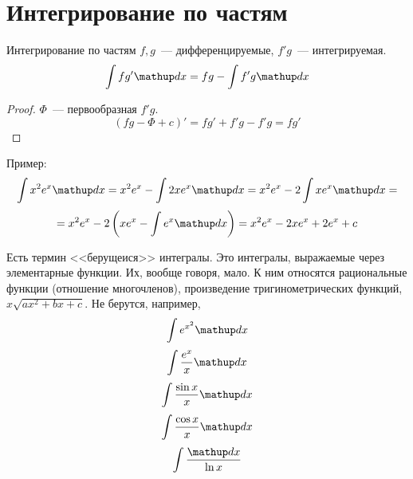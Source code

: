 ﻿\section{Интегрирование по частям}

\begin{theorem}{Интегрирование по частям}
$f, g$~--- дифференцируемые, $f'g$~--- интегрируемая.
$$\int fg'\d x = fg - \int f'g \d x$$
\end{theorem}
\begin{proof}
$\Phi$~--- первообразная $f'g$.
$$(fg - \Phi + c)' = fg' + f'g - f'g = fg'$$
\end{proof}

Пример:
$$\int x^2 e^x \d x = x^2 e^x - \int 2x e^x \d x = x^2 e^x - 2 \int x e^x \d x = $$
$$ = x^2 e^x - 2\left(x e^x - \int e^x \d x\right) = x^2 e^x - 2x e^x + 2e^x + c$$

Есть термин <<берущеися>> интегралы. Это интегралы, выражаемые через элементарные функции. Их, вообще говоря, мало. К ним относятся рациональные функции (отношение многочленов), произведение тригинометрических функций, $x\sqrt{ax^2 + bx + c}$. Не берутся, например, 
$$\int e^{x^2} \d x$$
$$\int \frac{e^x}x \d x$$
$$\int \frac{\sin x}x \d x$$
$$\int \frac{\cos x}x\d x$$
$$\int \frac{\d x}{\ln x}$$